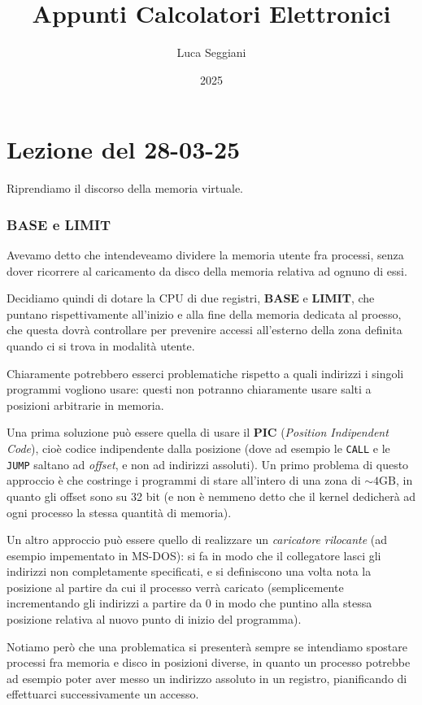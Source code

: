 \documentclass[a4paper,11pt]{article}
\title{Appunti Calcolatori Elettronici}
\author{Luca Seggiani}
\date{2025}
\begin{document}
\section{Lezione del 28-03-25}

\thispagestyle{empty}
\pagestyle{fancy}

Riprendiamo il discorso della memoria virtuale.

\subsubsection{BASE e LIMIT}
Avevamo detto che intendeveamo dividere la memoria utente fra processi, senza dover ricorrere al caricamento da disco della memoria relativa ad ognuno di essi.

Decidiamo quindi di dotare la CPU di due registri, \textbf{BASE} e \textbf{LIMIT}, che puntano rispettivamente all'inizio e alla fine della memoria dedicata al proesso, che questa dovrà controllare per prevenire accessi all'esterno della zona definita quando ci si trova in modalità utente.

Chiaramente potrebbero esserci problematiche rispetto a quali indirizzi i singoli programmi vogliono usare: questi non potranno chiaramente usare salti a posizioni arbitrarie in memoria.

Una prima soluzione può essere quella di usare il \textbf{PIC} (\textit{Position Indipendent Code}), cioè codice indipendente dalla posizione (dove ad esempio le \lstinline|CALL| e le \lstinline|JUMP| saltano ad \textit{offset}, e non ad indirizzi assoluti).
Un primo problema di questo approccio è che costringe i programmi di stare all'intero di una zona di $\sim 4 \text{GB}$, in quanto gli offset sono su 32 bit (e non è nemmeno detto che il kernel dedicherà ad ogni processo la stessa quantità di memoria).

Un altro approccio può essere quello di realizzare un \textit{caricatore rilocante} (ad esempio impementato in MS-DOS): si fa in modo che il collegatore lasci gli indirizzi non completamente specificati, e si definiscono una volta nota la posizione al partire da cui il processo verrà caricato (semplicemente incrementando gli indirizzi a partire da 0 in modo che puntino alla stessa posizione relativa al nuovo punto di inizio del programma).

Notiamo però che una problematica si presenterà sempre se intendiamo spostare processi fra memoria e disco in posizioni diverse, in quanto un processo potrebbe ad esempio poter aver messo un indirizzo assoluto in un registro, pianificando di effettuarci successivamente un accesso.
\end{document}
